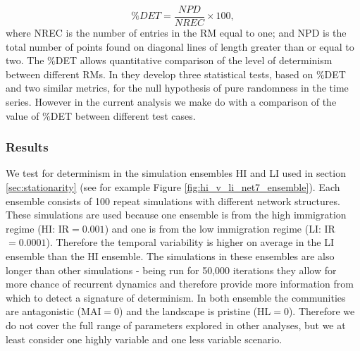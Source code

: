 \begin{equation}
\%DET = \frac{NPD}{NREC} \times 100,
\label{eq:pd}
\end{equation}
%
where NREC is the number of entries in the RM equal to one; and NPD is the total number of points found on diagonal lines of length greater than or equal to two. The $\%$DET allows quantitative comparison of the level of determinism between different RMs. In \cite{aparicio2008detecting} they develop three statistical tests, based on $\%$DET and two similar metrics, for the null hypothesis of pure randomness in the time series. However in the current analysis we make do with a comparison of the value of $\%$DET between different test cases.  




\subsubsection{Results}
\label{sec:rqa_results}

We test for determinism in the simulation ensembles HI and LI used in section \ref{sec:stationarity} (see for example Figure \ref{fig:hi_v_li_net7_ensemble}).  Each ensemble consists of 100 repeat simulations with different network structures. These simulations are used because one ensemble is from the high immigration regime (HI: IR$=0.001$) and one is from the low immigration regime (LI: IR$=0.0001$). Therefore the temporal variability is higher on average in the LI ensemble than the HI ensemble. The simulations in these ensembles are also longer than other simulations - being run for 50,000 iterations they allow for more chance of recurrent dynamics and therefore provide more information from which to detect a signature of determinism. In both ensemble the communities are antagonistic (MAI$=0$) and the landscape is pristine (HL$=0$). Therefore we do not cover the full range of parameters explored in other analyses, but we at least consider one highly variable and one less variable scenario.

